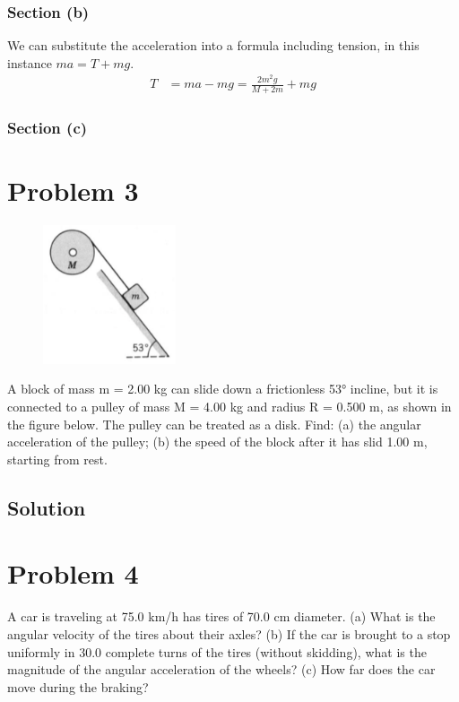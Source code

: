 \documentclass[12pt]{article}
\begin{document}
\subsubsection{Section (b)}
We can substitute the acceleration into a formula including tension, in this instance \(ma = T + mg\).
\begin{align}
    T   &=  ma - mg
        =   \frac{2m^2g}{M + 2m} + mg
\end{align}

\subsubsection{Section (c)}


\pagebreak

\section{Problem 3}
\begin{figure}
    \vspace{-30pt}
    \includegraphics[width=0.35\textwidth]{graph_3.png} 
\end{figure}
A block of mass m = 2.00 kg can slide down a frictionless 53\unit{\degree} incline, but it is connected to a pulley of mass M = 4.00 kg and radius R = 0.500 m, as shown in the figure below. The pulley can be treated as a disk. Find: (a) the angular acceleration of the pulley; (b) the speed of the block after it has slid 1.00 m, starting from rest.


\subsection{Solution}


\pagebreak

\section{Problem 4}
A car is traveling at 75.0 km/h has tires of 70.0 cm diameter. (a) What is the angular velocity of the tires about their axles? (b) If the car is brought to a stop uniformly in 30.0 complete turns of the tires (without skidding), what is the magnitude of the angular acceleration of the wheels? (c) How far does the car move during the braking?
\end{document}
